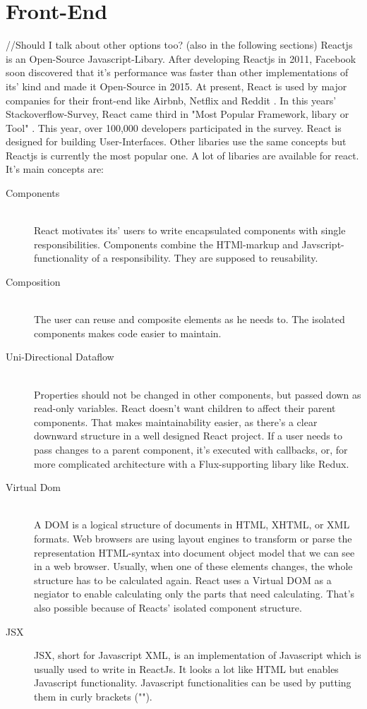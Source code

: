 \section{Front-End}
//Should I talk about other options too? (also in the following sections)
 Reactjs is an Open-Source Javascript-Libary.
After developing Reactjs in 2011, Facebook soon discovered that it's performance was faster than other implementations of its' kind and made it Open-Source in 2015. 
At present, React is used by major companies for their front-end like Airbnb, Netflix and Reddit \parencite{reactjsUsers}. 
In this years' Stackoverflow-Survey, React came third in "Most Popular Framework, libary or Tool" \parencite{stackOverflowSurvey}. 
This year, over 100,000 developers participated in the survey. 
React is designed for building User-Interfaces. Other libaries %
use the same concepts but Reactjs is currently the most popular one.
A lot of libaries are available for react. 
It's main concepts are:
\begin{description}
    \item[Components] \hfill \\
    React motivates its' users to write encapsulated components with single responsibilities. Components combine the HTMl-markup and Javscript-functionality of a responsibility. They are supposed to reusability. %
    \item[Composition] \hfill \\
    The user can reuse and composite elements as he needs to. The isolated components makes code easier to maintain. 
    \item[Uni-Directional Dataflow] \hfill \\
            Properties should not be changed in other components, but passed down as read-only variables. 
            React doesn't want children to affect their parent components. That makes maintainability easier, as there's a clear downward structure in a well designed React project.
            If a user needs to pass changes to a parent component, it's executed with callbacks, or, for more complicated architecture with a Flux-supporting libary like Redux.
    \item[Virtual Dom]\hfill \\
    A DOM%
    is a logical structure of documents in HTML, XHTML, or XML formats. 
    Web browsers are using layout engines to transform or parse the representation HTML-syntax into document object model that we can see in a web browser.
    Usually, when one of these elements changes, the whole structure has to be calculated again. 
    React uses a Virtual DOM as a negiator to enable calculating only the parts that need calculating. That's also possible because of Reacts' isolated component structure.
    \item[JSX]  JSX, short for Javascript XML, is an implementation of Javascript which is usually used to write in ReactJs. 
    It looks a lot like HTML but enables Javascript functionality. Javascript functionalities can be used by putting them in curly brackets ("{}").
\end{description}
